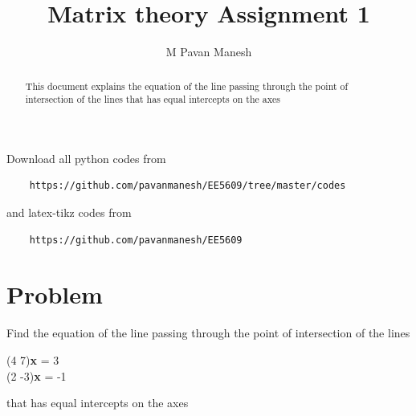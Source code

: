 \documentclass[journal,12pt,twocolumn]{IEEEtran}
\begin{document}
    \makeatletter
    \makeatother
    \let\StandardTheFigure\thefigure
    \let\vec\mathbf
    \renewcommand{\thefigure}{\theproblem}
    \def\putbox#1#2#3{\makebox[0in][l]{\makebox[#1][l]{}\raisebox{\baselineskip}[0in][0in]{\raisebox{#2}[0in][0in]{#3}}}}
         \def\rightbox#1{\makebox[0in][r]{#1}}
         \def\centbox#1{\makebox[0in]{#1}}
         \def\topbox#1{\raisebox{-\baselineskip}[0in][0in]{#1}}
         \def\midbox#1{\raisebox{-0.5\baselineskip}[0in][0in]{#1}}
    \vspace{3cm}
    \title{Matrix theory Assignment 1}
    \author{M Pavan Manesh}
    \maketitle
    \newpage
    \bigskip
    \renewcommand{\thefigure}{\theenumi}
    \renewcommand{\thetable}{\theenumi}
    \begin{abstract}
    This document explains the equation of the line passing through
    the point of intersection of the lines that has equal intercepts on the axes 
    \end{abstract}
    Download all python codes from 
    \begin{lstlisting}
    https://github.com/pavanmanesh/EE5609/tree/master/codes
    \end{lstlisting}
    and latex-tikz codes from 
    \begin{lstlisting}
    https://github.com/pavanmanesh/EE5609
    \end{lstlisting}
    \section{Problem}
    Find the equation of the line passing through
    the point of intersection of the lines
    \begin{center}
    (4   7)\textbf{x} = 3 \\
    (2   -3)\textbf{x} = -1
    \end{center}
    that has equal intercepts on the axes
\end{document}
